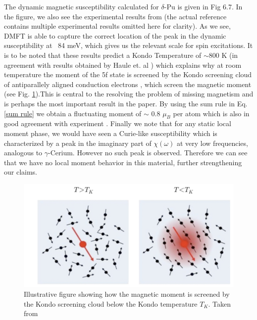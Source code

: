 \documentclass[10pt]{ruthesis}
\begin{document}
{The dynamic magnetic susceptibility calculated for $\delta$-Pu is given in Fig 6.7. In the figure, we also see the experimental results from \cite{Me_Pu} (the actual reference contains multiple experimental results omitted here for clarity). As we see, DMFT is able to capture the correct location of the peak in the dynamic susceptibility at ~84 meV, which gives us the relevant scale for spin excitations. It is to be noted that these results predict a Kondo Temperature of $\sim$800 K (in agreement with results obtained by Haule et. al \cite{Haule_Pu} )  which explains why at room temperature the moment of the 5f state is screened by the Kondo screening cloud of antiparallely aligned conduction electrons , which screen the magnetic moment (see Fig. \ref{Kondo_fig}).This is central to the resolving the problem of missing magnetism and is perhaps the most important result in the paper. By using the sum rule in Eq. \ref{sum rule} we obtain a fluctuating moment of $\sim$ 0.8 $\mu_B$ per atom which is also in good agreement with experiment \cite{Me_Pu}. Finally we note that for any static local moment phase, we would have seen a Curie-like susceptibility which is characterized by a peak in the imaginary part of $\chi(\omega)$ at very low frequencies, analogous to $\gamma$-Cerium. However no such peak is observed. Therefore we can see that we have no local moment behavior in this material, further strengthening our claims.

\begin{figure}[H]
\begin{center}
\includegraphics[width=\columnwidth]{Kondo_Pu.jpg}
\caption{ Illustrative figure showing how the magnetic moment is screened by the Kondo screening cloud below the Kondo temperature $T_K$. Taken from \cite{Me_Pu} \label{Kondo_fig}}
\end{center}

\end{figure}

}
\end{document}
